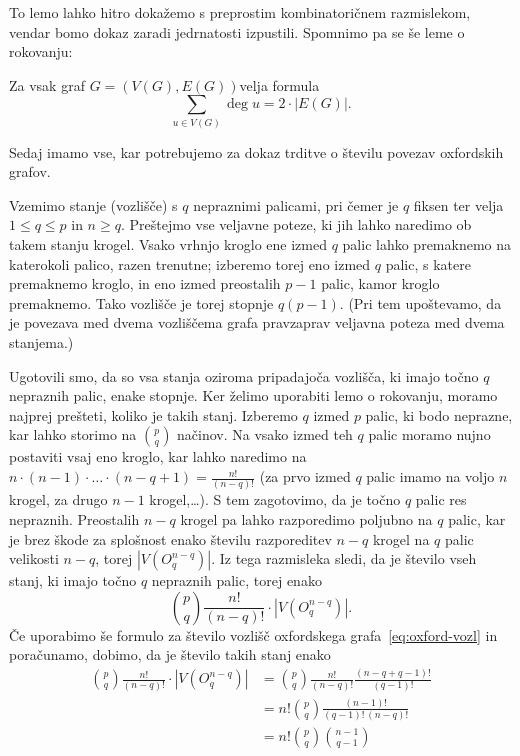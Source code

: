 \documentclass[twoside,11pt]{article}
\newcommand{\graf}[1][G]{\ensuremath{#1 = (V(#1), E(#1))}}
\DeclareMathOperator {\stopnja} {deg}
\begin{document}
To lemo lahko hitro dokažemo s preprostim kombinatoričnem razmislekom, vendar bomo dokaz zaradi jedrnatosti izpustili. Spomnimo pa se še leme o rokovanju:
\begin{lema}
    \label{lema:rokovanje}
    Za vsak graf \graf velja formula
    \begin{equation}
    \sum_{u \in V(G)}\! \stopnja u = 2 \cdot |E(G)|.
    \label{eq:lema-o-rokovanju}
    \end{equation}
\end{lema}

Sedaj imamo vse, kar potrebujemo za dokaz trditve o številu povezav oxfordskih grafov.

Vzemimo stanje (vozlišče) s $q$ nepraznimi palicami, pri čemer je $q$ fiksen ter velja $1 \leq q \leq p$ in $n \geq q$. Preštejmo vse veljavne poteze, ki jih lahko naredimo ob takem stanju krogel. Vsako vrhnjo kroglo ene izmed $q$ palic lahko premaknemo na katerokoli palico, razen trenutne; izberemo torej eno izmed $q$ palic, s katere premaknemo kroglo, in eno izmed preostalih $p-1$ palic, kamor kroglo premaknemo. Tako vozlišče je torej stopnje $q(p-1)$. (Pri tem upoštevamo, da je povezava med dvema vozliščema grafa pravzaprav veljavna poteza med dvema stanjema.)

Ugotovili smo, da so vsa stanja oziroma pripadajoča vozlišča, ki imajo točno $q$ nepraznih palic, enake stopnje. Ker želimo uporabiti lemo o rokovanju, moramo najprej prešteti, koliko je takih stanj. 
Izberemo $q$ izmed $p$ palic, ki bodo neprazne, kar lahko storimo na ${p \choose q}$ načinov. Na vsako izmed teh $q$ palic moramo nujno postaviti vsaj eno kroglo, kar lahko naredimo na $n \cdot (n-1) \cdot \ldots \cdot (n-q+1) = \frac{n!}{(n-q)!}$ (za prvo izmed $q$ palic imamo na voljo $n$ krogel, za drugo $n-1$ krogel,\ldots). S tem zagotovimo, da je točno $q$ palic res nepraznih. Preostalih $n-q$ krogel pa lahko razporedimo poljubno na $q$ palic, kar je brez škode za splošnost enako številu razporeditev $n-q$ krogel na $q$ palic velikosti $n-q$, torej $|V(O^{n-q}_q)|$.
Iz tega razmisleka sledi, da je število vseh stanj, ki imajo točno $q$ nepraznih palic, torej enako
\[{p \choose q} \frac{n!}{(n-q)!} \cdot |V(O^{n-q}_q)|.\]
Če uporabimo še formulo za število vozlišč oxfordskega grafa~\eqref{eq:oxford-vozl} in poračunamo, dobimo, da je število takih stanj enako
\begin{align*}
{p \choose q} \frac{n!}{(n-q)!} \cdot |V(O^{n-q}_q)| &=
{p \choose q} \frac{n!}{(n-q)!} \frac{(n-q+q-1)!}{(q-1)!} \\ &= n! {p \choose q} \frac{(n-1)!}{(q-1)!\,(n-q)!} \\ &=
n! {p \choose q} {n-1 \choose q-1}
\end{align*}
\end{document}
